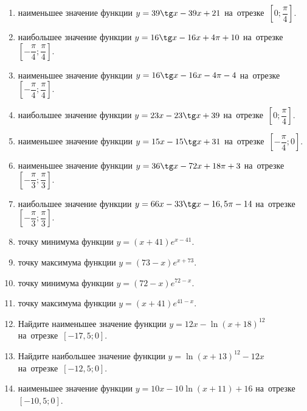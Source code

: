 \documentclass[a4paper,10pt]{article}
\begin{document}
\begin{enumerate}
\item {} наименьшее значение функции $y = 39\tg x-39x+21$ на~отрезке~$\left[0;\dfrac{\pi }{4}\right]$.

\item {} наибольшее значение функции $y=16\tg x-16x+4\pi +10$ на~отрезке~$\left[-\dfrac{\pi }{4};\dfrac{\pi }{4}\right]$.

\item {} наименьшее значение функции $y=16\tg x-16x-4\pi -4$ на~отрезке~$\left[-\dfrac{\pi }{4};\dfrac{\pi }{4}\right]$.

\item {} наибольшее значение функции $y = 23x-23\tg x +39$ на~отрезке~$\left[0;\dfrac{\pi }{4}\right]$.

\item {} наименьшее значение функции $y = 15x-15\tg x +31$ на~отрезке~$\left[-\dfrac{\pi }{4};0\right]$.

\item {} наименьшее значение функции $y = 36\tg x-72x+18 \pi +3$ на~отрезке~$\left[-\dfrac{\pi }{3};\dfrac{\pi }{3}\right]$.

\item {} наибольшее значение функции $y = 66x-33\tg x-16,5\pi -14$ на~отрезке~$\left[-\dfrac{\pi }{3};\dfrac{\pi }{3}\right]$.

\item {} точку минимума функции $y = \left(x+41\right)e^{x-41}$.

\item {} точку максимума функции $y = \left(73-x\right)e^{x+73}$.

\item {} точку минимума функции $y = \left(72-x\right)e^{72-x}$.

\item {} точку максимума функции $y = \left(x+41\right)e^{41-x}$.

\item Найдите наименьшее значение функции $y = 12x-\ln \left(x+18\right)^{12}$ на~отрезке~$\left[-17,5;0\right]$.

\item Найдите наибольшее значение функции $y = \ln \left(x+13\right)^{12}-12x$ на~отрезке~$\left[-12,5;0\right]$.

\item {} наименьшее значение функции $y = 10x-10\ln \left(x+11\right) +16$ на~отрезке~$\left[-10,5;0\right]$.


\end{enumerate}
\end{document}
